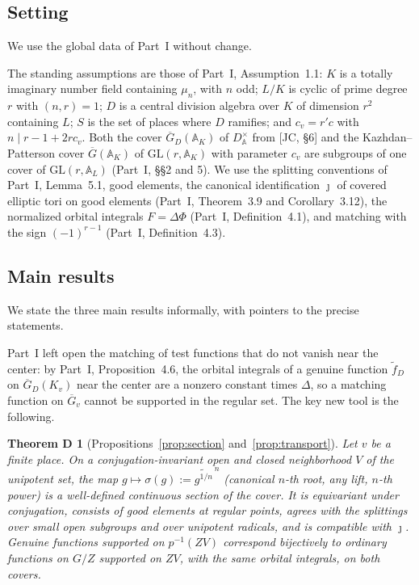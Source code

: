 \documentclass[12pt]{article}
\newcommand{\ov}[1]{\overline{#1}}
\newcommand{\A}{\mathbb{A}}
\newcommand{\GL}{\mathrm{GL}}
\newcommand{\Gb}{\ov{G}}
\newcommand{\GDb}{\ov{G}_D}
\newcommand{\jj}{\jmath}
\newcommand{\sg}{\sigma}
\theoremstyle{plain}
\newtheorem*{theoremD}{Theorem D}
\theoremstyle{definition}
\begin{document}
\subsection{Setting}
We use the global data of Part~I without change.

The standing assumptions are those of Part~I, Assumption~1.1: $K$ is a totally imaginary number field containing $\mu_n$, with $n$ odd; $L/K$ is cyclic of prime degree $r$ with $(n,r)=1$; $D$ is a central division algebra over $K$ of dimension $r^2$ containing $L$; $S$ is the set of places where $D$ ramifies; and $c_v=r'c$ with $n\mid r-1+2rc_v$. Both the cover $\GDb(\A_K)$ of $D^\times_{\A}$ from [JC, \S6] and the Kazhdan--Patterson cover $\Gb(\A_K)$ of $\GL(r,\A_K)$ with parameter $c_v$ are subgroups of one cover of $\GL(r,\A_L)$ (Part~I, \S\S2 and 5). We use the splitting conventions of Part~I, Lemma~5.1, good elements, the canonical identification $\jj$ of covered elliptic tori on good elements (Part~I, Theorem~3.9 and Corollary~3.12), the normalized orbital integrals $F=\Delta\Phi$ (Part~I, Definition~4.1), and matching with the sign $(-1)^{r-1}$ (Part~I, Definition~4.3).

\subsection{Main results}\label{subsec:main}
We state the three main results informally, with pointers to the precise statements.

Part~I left open the matching of test functions that do not vanish near the center: by Part~I, Proposition~4.6, the orbital integrals of a genuine function $\tilde f_D$ on $\GDb(K_v)$ near the center are a nonzero constant times $\Delta$, so a matching function on $\Gb_v$ cannot be supported in the regular set. The key new tool is the following.

\begin{theoremD}[Propositions~\ref{prop:section} and~\ref{prop:transport}]
Let $v$ be a finite place. On a conjugation-invariant open and closed neighborhood $V$ of the unipotent set, the map $g\mapsto\sg(g):=\widetilde{g^{1/n}}^{\,n}$ (canonical $n$-th root, any lift, $n$-th power) is a well-defined continuous section of the cover. It is equivariant under conjugation, consists of good elements at regular points, agrees with the splittings over small open subgroups and over unipotent radicals, and is compatible with $\jj$. Genuine functions supported on $p^{-1}(ZV)$ correspond bijectively to ordinary functions on $G/Z$ supported on $ZV$, with the same orbital integrals, on both covers.
\end{theoremD}
\end{document}
